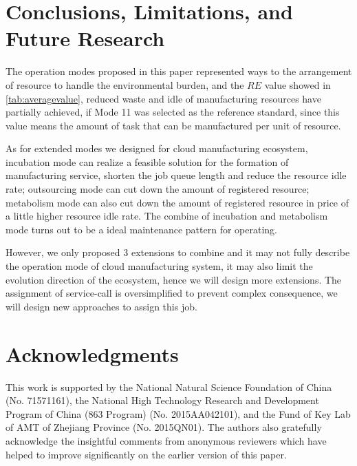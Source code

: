 \section{Conclusions, Limitations, and Future Research} %
\label{sec:contributions_limitations_and_future_research}
The operation modes proposed in this paper represented ways to the arrangement of resource to handle the environmental burden, and the $RE$ value showed in \autoref{tab:averagevalue}, reduced waste and idle of manufacturing resources have partially achieved, if Mode 11 was selected as the reference standard, since this value means the amount of task that can be manufactured per unit of resource.   

As for extended modes we designed for cloud manufacturing ecosystem, incubation mode can realize a feasible solution for the formation of manufacturing service, shorten the job queue length and reduce the resource idle rate; outsourcing mode can cut down the amount of registered resource; metabolism mode can also cut down the amount of registered resource in price of a little higher resource idle rate. The combine of incubation and metabolism mode turns out to be a ideal maintenance pattern for operating.

However, we only proposed 3 extensions to combine and it may not fully describe the operation mode of cloud manufacturing system, it may also limit the evolution direction of the ecosystem, hence we will design more extensions. The assignment of service-call is oversimplified to prevent complex consequence, we will design new approaches to assign this job.

\section{Acknowledgments} %
\label{sec:acknowledgments}
This work is supported by the National Natural Science Foundation of China (No. 71571161), the National High Technology Research and Development Program of China (863 Program) (No. 2015AA042101), and the Fund of Key Lab of AMT of Zhejiang Province (No. 2015QN01). The authors also gratefully acknowledge the insightful comments from anonymous reviewers which have helped to
improve significantly on the earlier version of this paper.
